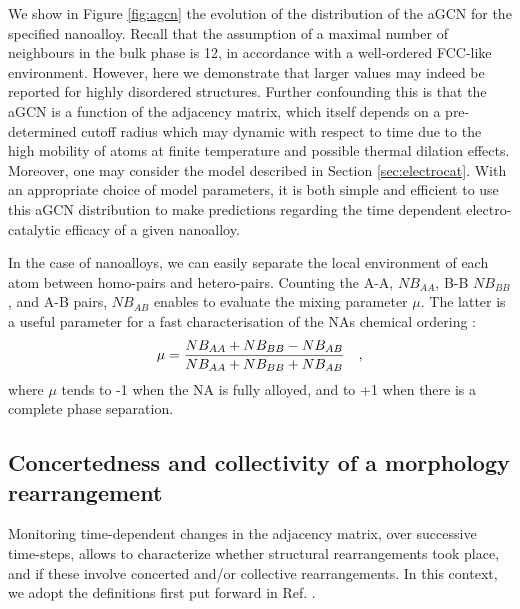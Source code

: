 We show in Figure \ref{fig:agcn} the evolution of the distribution of the aGCN for the specified nanoalloy. Recall that the assumption of a maximal number of neighbours in the bulk phase is 12, in accordance with a well-ordered FCC-like environment. However, here we demonstrate that larger values may indeed be reported for highly disordered structures. Further confounding this is that the aGCN is a function of the adjacency matrix, which itself depends on a pre-determined cutoff radius which may dynamic with respect to time due to the high mobility of atoms at finite temperature and possible thermal dilation effects. Moreover, one may consider the model described in Section \ref{sec:electrocat}. With an appropriate choice of model parameters, it is both simple and efficient to use this aGCN distribution to make predictions regarding the time dependent electro-catalytic efficacy of a given nanoalloy.

In the case of nanoalloys, we can easily separate the local environment of each atom between homo-pairs and hetero-pairs. 
Counting the A-A, $NB_{AA}$, B-B $NB_{BB}$, and A-B pairs, $NB_{AB}$ enables to evaluate the mixing parameter $\mu$.
The latter is a useful parameter for a fast characterisation of the NAs chemical ordering :
\begin{equation}
\mu = \frac{NB_{AA} + NB_{BB} - NB_{AB}}{NB_{AA} + NB_{BB} + NB_{AB}} {\mbox ~~~,}
\end{equation}
where $\mu$ tends to -1 when the NA is fully alloyed, and to +1 when there is a complete phase separation.

\subsection{Concertedness and collectivity of a morphology rearrangement}

Monitoring time-dependent changes in the adjacency matrix, over successive time-steps, allows to characterize whether structural rearrangements took place, and if these involve concerted and/or collective rearrangements.
%
In this context, we adopt the definitions first put forward in Ref. \cite{Rossi2018}.

